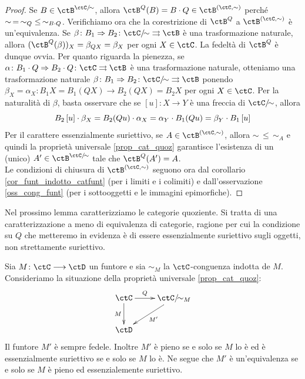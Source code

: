 \begin{proof}
 Se \(B \in \ctB^{\ctC/{\!\sim}}\), allora \(\ctB^Q(B) = B \cmp Q \in \ctB^{(\ctC,\sim)}\) perché \(\sim \,=\, \sim_Q \;\leq\, \sim_{B \cdot Q}\).
 Verifichiamo ora che la corestrizione di \(\ctB^Q\) a \(\ctB^{(\ctC,\sim)}\) è un'equivalenza. Se
 \(\beta \colon B_1 \nat B_2 \colon \ctC/{\!\sim} \rightrightarrows \ctB\) è una trasformazione naturale, allora
 \((\ctB^Q(\beta))_X = \beta_{QX} = \beta_X\) per ogni \(X \in \ctC\). La fedeltà di \(\ctB^Q\) è dunque ovvia. Per quanto riguarda
 la pienezza, se \(\alpha \colon B_1 \cmp Q \nat B_2 \cmp Q \colon \ctC \rightrightarrows \ctB\) è una trasformazione naturale,
 otteniamo una trasformazione naturale \(\beta \colon B_1 \nat B_2 \colon \ctC/{\!\sim} \rightrightarrows \ctB\)
 ponendo \(\beta_X = \alpha_X \colon B_1X = B_1(QX) \to B_2(QX) = B_2X\) per ogni \(X \in \ctC\). Per la naturalità di \(\beta\),
 basta osservare che se \(\left[u\right] \colon X \to Y\) è una freccia di \(\ctC/{\!\sim}\), allora
 \[B_2\left[u\right] \cdot \beta_X = B_2(Qu) \cdot \alpha_X = \alpha_Y \cdot B_1(Qu) = \beta_Y \cdot B_1\left[u\right] \]
 Per il carattere essenzialmente suriettivo, se \(A \in \ctB^{(\ctC,\sim)}\), allora \(\sim \,\leq\, \sim_A\) e quindi la proprietà
 universale \ref{prop_cat_quoz} garantisce l'esistenza di un (unico) \(A' \in \ctB^{\ctC/{\!\sim}}\) tale che \(\ctB^Q(A')=A\). \\
 Le condizioni di chiusura di \(\ctB^{(\ctC,\sim)}\) seguono ora dal corollario \ref{cor_funt_indotto_catfunt} (per i limiti e i colimiti) e
 dall'osservazione \ref{oss_cong_funt} (per i sottooggetti e le immagini epimorfiche).
\end{proof}

Nel prossimo lemma caratterizziamo le categorie quoziente. Si tratta di una caratterizzazione a meno di equivalenza di
categorie, ragione per cui la condizione su \(Q\) che metteremo in evidenza è di essere essenzialmente suriettivo sugli
oggetti, non strettamente suriettivo.

\begin{lemma}\label{lemma_caratt_categ_quoz}
 Sia \(M \colon \ctC \fun \ctD\) un funtore e sia \(\sim_M\) la \(\ctC\)-conguenza indotta de \(M\). Consideriamo la situazione
 della proprietà universale \ref{prop_cat_quoz}:
 \[\xymatrix{\ctC \ar[r]^-{Q} \ar[d]_-{M} & \ctC/{\!\sim_M} \ar[ld]^{M'} \\ \ctD }\]
 Il funtore \(M'\) è sempre fedele. Inoltre \(M'\) è pieno se e solo se \(M\) lo è ed è essenzialmente suriettivo se e solo
 se \(M\) lo è. Ne segue che \(M'\) è un'equivalenza se e solo se \(M\) è pieno ed essenzialemente suriettivo.
\end{lemma}

